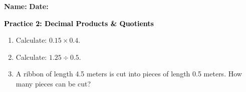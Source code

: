 \documentclass[12pt, letterpaper, fleqn]{article}
\begin{document}
\textbf{Name:} \underline{\hspace{5cm}}
\hfill
\textbf{Date:} \underline{\hspace{3cm}}\\

\begin{tcolorbox}[colback=customteal!20]
    \large\textcolor{black}{\textbf{Practice 2: Decimal Products & Quotients}}
\end{tcolorbox}
\begin{enumerate}[itemsep=3.5cm, leftmargin=0.6cm]
\item Calculate: $0.15 \times 0.4$.
\vspace{3.5cm}
\item Calculate: $1.25 \div 0.5$.
\vspace{3.5cm}
\item A ribbon of length 4.5 meters is cut into pieces of length 0.5 meters. How many pieces can be cut?
\end{enumerate}
\end{document}
